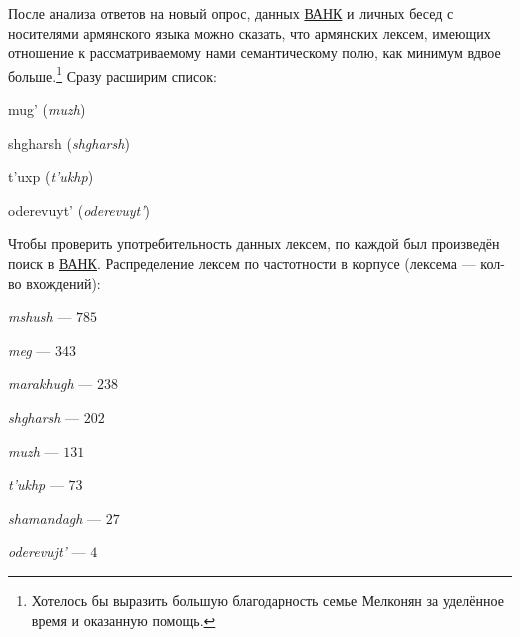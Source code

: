 \par После анализа ответов на новый опрос, данных \hyperlink{eanc}{ВАНК} и личных бесед с носителями армянского языка можно сказать, что армянских лексем, имеющих отношение к рассматриваемому нами семантическому полю, как минимум вдвое больше.\footnote{Хотелось бы выразить большую благодарность семье Мелконян за уделённое время и оказанную помощь.} Сразу расширим список:

\begin{itemize}[topsep=0pt,itemsep=0pt,parsep=0pt,partopsep=0pt,leftmargin=2.5cm]
    \setcounter{enumi}{4}
    \begin{multicols}{2}
    \item \; \textarmenian {mug'} \;  (\textit{muzh})
    \item \; \textarmenian {shgharsh} \; (\textit{shgharsh})
    \item \; \textarmenian {t'uxp} \; (\textit{t’ukhp})
    \item \; \textarmenian {oderevuyt'} \; (\textit{oderevuyt’})
    \end{multicols}
\end{itemize}

\par Чтобы проверить употребительность данных лексем, по каждой был произведён поиск в \hyperlink{eanc}{ВАНК}. Распределение лексем по частотности в корпусе (лексема --- кол-во вхождений): 
\begin{enumerate}
\begin{multicols}{4}
    \item \textit{mshush} --- $785$
    \item \textit{meg} --- $343$
    \item \textit{marakhugh} --- $238$
    \item \textit{shgharsh} --- $202$
    \item \textit{muzh} --- $131$
    \item \textit{t’ukhp} --- $73$
    \item \textit{shamandagh} --- $27$
    \item \textit{oderevujt’} --- $4$
\end{multicols}
\end{enumerate}

